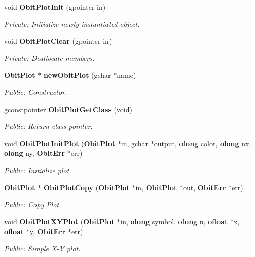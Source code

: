 \begin{CompactItemize}
\item 
void {\bf Obit\-Plot\-Init} (gpointer in)
\begin{CompactList}\small\item\em Private: Initialize newly instantiated object. \item\end{CompactList}\item 
void {\bf Obit\-Plot\-Clear} (gpointer in)
\begin{CompactList}\small\item\em Private: Deallocate members. \item\end{CompactList}\item 
{\bf Obit\-Plot} $\ast$ {\bf new\-Obit\-Plot} (gchar $\ast$name)
\begin{CompactList}\small\item\em Public: Constructor. \item\end{CompactList}\item 
gconstpointer {\bf Obit\-Plot\-Get\-Class} (void)
\begin{CompactList}\small\item\em Public: Return class pointer. \item\end{CompactList}\item 
void {\bf Obit\-Plot\-Init\-Plot} ({\bf Obit\-Plot} $\ast$in, gchar $\ast$output, {\bf olong} color, {\bf olong} nx, {\bf olong} ny, {\bf Obit\-Err} $\ast$err)
\begin{CompactList}\small\item\em Public: Initialize plot. \item\end{CompactList}\item 
{\bf Obit\-Plot} $\ast$ {\bf Obit\-Plot\-Copy} ({\bf Obit\-Plot} $\ast$in, {\bf Obit\-Plot} $\ast$out, {\bf Obit\-Err} $\ast$err)
\begin{CompactList}\small\item\em Public: Copy Plot. \item\end{CompactList}\item 
void {\bf Obit\-Plot\-XYPlot} ({\bf Obit\-Plot} $\ast$in, {\bf olong} symbol, {\bf olong} n, {\bf ofloat} $\ast$x, {\bf ofloat} $\ast$y, {\bf Obit\-Err} $\ast$err)
\begin{CompactList}\small\item\em Public: Simple X-Y plot. \item\end{CompactList}\item 

\end{CompactItemize}
